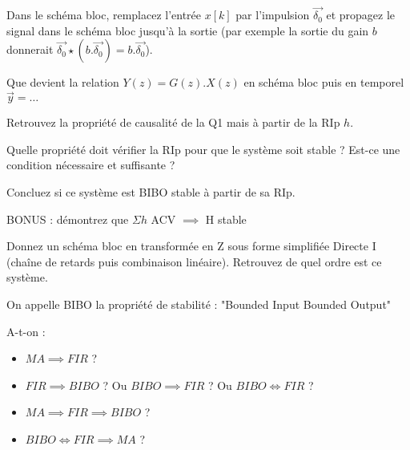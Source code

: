 Dans le schéma bloc, remplacez l'entrée $x[k]$ par l'impulsion
$\vec{\delta_0}$ et propagez le signal dans le schéma bloc jusqu'à la
sortie (par exemple la sortie du gain $b$ donnerait
$\vec{\delta_0} \star (b.\vec{\delta_0}) = b.\vec{\delta_0}$).

Que devient la relation $Y(z) = G(z) . X(z)$ en schéma bloc puis en
temporel $\vec{y} = \dots$



Retrouvez la propriété de causalité de la Q1 mais à partir de la RIp $h$. 



Quelle propriété doit vérifier la RIp pour que le système soit stable
? Est-ce une condition nécessaire et suffisante ?

Concluez si ce système est BIBO stable à partir de sa RIp.

BONUS : démontrez que $\Sigma h$ ACV $\implies$ H stable


Donnez un schéma bloc en transformée en Z sous forme simplifiée Directe I (chaîne de retards puis combinaison linéaire). Retrouvez de quel ordre est ce système.

On appelle BIBO la propriété de stabilité : "Bounded Input Bounded Output"

A-t-on :

\begin{itemize}
\item  $MA \implies FIR$ ?  
\item $FIR \implies BIBO$ ? Ou $BIBO \implies FIR$ ? Ou $BIBO \iff FIR$ ?  
\item $MA \implies FIR \implies BIBO$ ?  
\item $BIBO \iff FIR \implies MA$ ?  
\end{itemize}

